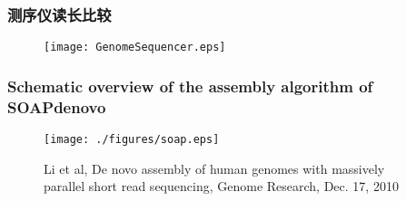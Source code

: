 \documentclass[mathserif]{beamer}
\begin{document}
	\begin{frame}
		\frametitle{测序仪读长比较}
                          \begin{figure}
				\centering
				\texttt{[image: GenomeSequencer.eps]}
			\end{figure}
		
	\end{frame}

	
	
	
\begin{frame}
		\frametitle{Schematic overview of the assembly algorithm of SOAPdenovo}
			\begin{figure}
				\centering
				\texttt{[image: ./figures/soap.eps]}
				\caption{\tiny Li et al, De novo assembly of human genomes with massively parallel short read sequencing, Genome Research, Dec. 17, 2010}
			\end{figure}
	\end{frame}
	
\end{document}
